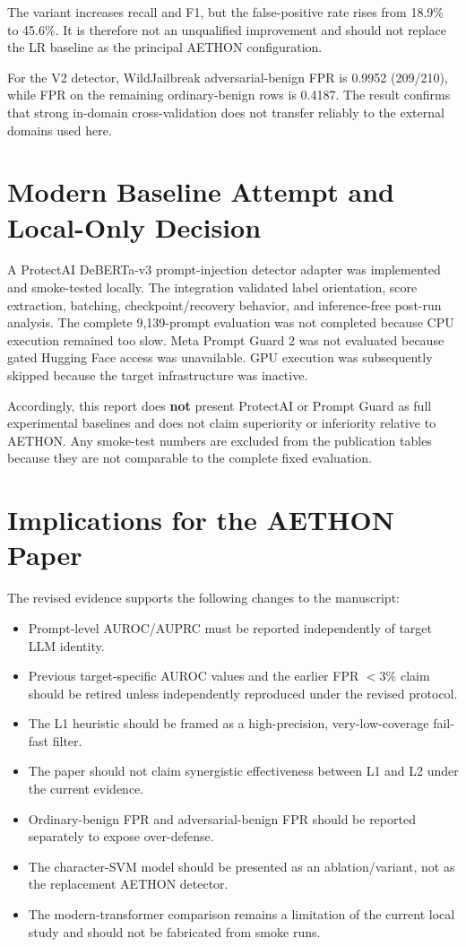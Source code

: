 \documentclass[11pt,a4paper]{article}
\begin{document}
The variant increases recall and F1, but the false-positive rate rises from 18.9\% to 45.6\%. It is therefore not an unqualified improvement and should not replace the LR baseline as the principal AETHON configuration.

For the V2 detector, WildJailbreak adversarial-benign FPR is 0.9952 (209/210), while FPR on the remaining ordinary-benign rows is 0.4187. The result confirms that strong in-domain cross-validation does not transfer reliably to the external domains used here.

\section{Modern Baseline Attempt and Local-Only Decision}
A ProtectAI DeBERTa-v3 prompt-injection detector adapter was implemented and smoke-tested locally. The integration validated label orientation, score extraction, batching, checkpoint/recovery behavior, and inference-free post-run analysis. The complete 9,139-prompt evaluation was not completed because CPU execution remained too slow. Meta Prompt Guard 2 was not evaluated because gated Hugging Face access was unavailable. GPU execution was subsequently skipped because the target infrastructure was inactive.

Accordingly, this report does \textbf{not} present ProtectAI or Prompt Guard as full experimental baselines and does not claim superiority or inferiority relative to AETHON. Any smoke-test numbers are excluded from the publication tables because they are not comparable to the complete fixed evaluation.

\section{Implications for the AETHON Paper}
The revised evidence supports the following changes to the manuscript:

\begin{itemize}[leftmargin=*]
  \item Prompt-level AUROC/AUPRC must be reported independently of target LLM identity.
  \item Previous target-specific AUROC values and the earlier FPR $<3\%$ claim should be retired unless independently reproduced under the revised protocol.
  \item The L1 heuristic should be framed as a high-precision, very-low-coverage fail-fast filter.
  \item The paper should not claim synergistic effectiveness between L1 and L2 under the current evidence.
  \item Ordinary-benign FPR and adversarial-benign FPR should be reported separately to expose over-defense.
  \item The character-SVM model should be presented as an ablation/variant, not as the replacement AETHON detector.
  \item The modern-transformer comparison remains a limitation of the current local study and should not be fabricated from smoke runs.
\end{itemize}
\end{document}
